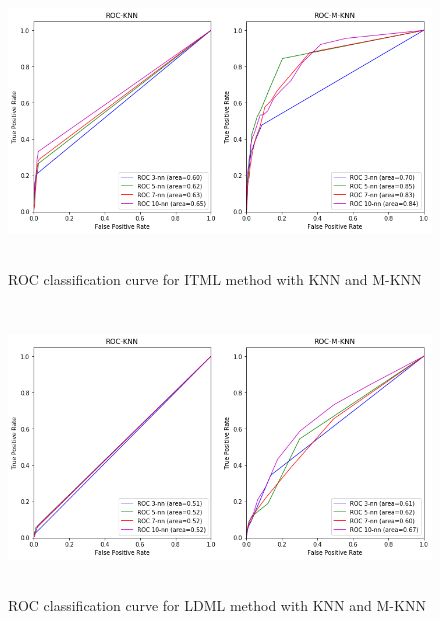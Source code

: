 \documentclass{article}
\begin{document}
\begin{figure}[H]
    \centering
    \includegraphics[height=3in]{./itml_lfw_result.png}
    \caption[ITML: ROC on LFW dataset]{ROC classification curve for ITML method with KNN and M-KNN}
    \label{fig:fig_name}
\end{figure}

\begin{figure}[H]
    \centering
    \includegraphics[height=3in]{./ldml_lfw_result.png}
    \caption[LDML: ROC on LFW dataset]{ROC classification curve for LDML method with KNN and M-KNN}
    \label{fig:fig_name}
\end{figure}

\end{document}
